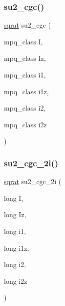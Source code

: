 \mbox{\label{adat-devel_2lib_2SU3_2SU3_8h_a391f85ee5656866779d3efe09c992cc4}} 
\subsubsection{\texorpdfstring{su2\_cgc()}{su2\_cgc()}}
{\footnotesize\ttfamily \mbox{\hyperlink{classsqrat}{sqrat}} su2\+\_\+cgc (\begin{DoxyParamCaption}\item[{mpq\+\_\+class}]{I,  }\item[{mpq\+\_\+class}]{Iz,  }\item[{mpq\+\_\+class}]{i1,  }\item[{mpq\+\_\+class}]{i1z,  }\item[{mpq\+\_\+class}]{i2,  }\item[{mpq\+\_\+class}]{i2z }\end{DoxyParamCaption})}

\mbox{\label{adat-devel_2lib_2SU3_2SU3_8h_ae6ace82d1208ded7ef1fc847e1b6dc1b}} 
\subsubsection{\texorpdfstring{su2\_cgc\_2i()}{su2\_cgc\_2i()}}
{\footnotesize\ttfamily \mbox{\hyperlink{classsqrat}{sqrat}} su2\+\_\+cgc\+\_\+2i (\begin{DoxyParamCaption}\item[{long}]{I,  }\item[{long}]{Iz,  }\item[{long}]{i1,  }\item[{long}]{i1z,  }\item[{long}]{i2,  }\item[{long}]{i2z }\end{DoxyParamCaption})}


